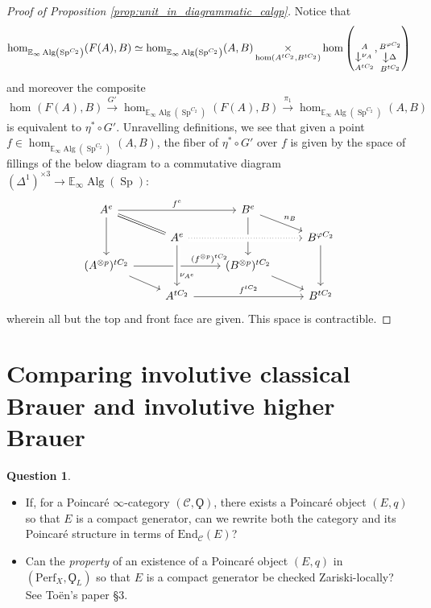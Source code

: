 \documentclass{article}
\DeclareMathOperator{\Alg}{Alg}
\DeclareMathOperator{\CAlgp}{CAlg^p} %
\DeclareMathOperator{\Spectra}{Sp} %
\DeclareMathOperator*{\fiberproduct}{\times}
\newcommand{\EE}{\mathbb{E}}
\newcommand{\morphism}[3]{\mathop{\rotatebox{270}{$\xrightarrow{\rotatebox{90}{$\scriptstyle#2$}}$}}\limits^{#1}_{#3}}
\theoremstyle{definition}
\newtheorem{question}[equation]{Question}
\begin{document}
\begin{proof}[Proof of Proposition \ref{prop:unit_in_diagrammatic_calgp}]
    Notice that 
    \begin{equation*}
        \hom_{\EE_\infty\Alg\left(\Spectra^{C_2}\right)}(F(A),B) \simeq \hom_{\EE_\infty\Alg\left(\Spectra^{C_2}\right)}(A,B) \fiberproduct_{\hom\left(A^{tC_2},B^{tC_2}\right) } \hom \left( \morphism{A}{\nu_A}{A^{tC_2}}, \morphism{B^{\varphi C_2}}{\Delta}{B^{tC_2}} \right)
    \end{equation*}
    and moreover the composite
    \begin{equation*}
        \hom_{\CAlgp}(F(A), B) \xrightarrow{G'} \hom_{\EE_\infty\Alg\left(\Spectra^{C_2}\right)}(F(A),B) \xrightarrow{\pi_1} \hom_{\EE_\infty\Alg\left(\Spectra^{C_2}\right)}(A,B)
    \end{equation*}
     is equivalent to $ \eta^* \circ G' $. 
    Unravelling definitions, we see that given a point $ f \in \hom_{\EE_\infty\Alg\left(\Spectra^{C_2}\right)}(A,B) $, the fiber of $ \eta^* \circ G' $ over $ f $ is given by the space of fillings of the below diagram to a commutative diagram $ (\Delta^1)^{\times 3} \to \EE_\infty\Alg(\Spectra) $:  
    \begin{equation*}
    \begin{tikzcd}[row sep=small] %
        A^e \ar[rr,"{f^e}"] \ar[dd] \ar[rd,equals] & & B^e \ar[dd] \ar[rd,"{n_B}"] & \\
            & A^e  \ar[rr, dotted,crossing over] & & B^{\varphi C_2} \ar[dd] \\
        {(A^{\otimes p})^{tC_2}} \ar[rr,"{(f^{\otimes p})^{tC_2}}",very near end] \ar[rd] & & {( B^{\otimes p})^{tC_2}} \ar[rd] & \\
        & A^{tC_2} \ar[rr,"{f^{tC_2}}"] & & B^{tC_2} \ar[from=2-2,to=4-2,crossing over,"{\nu_{A^e}}", near end]
    \end{tikzcd}
    \end{equation*} 
    wherein all but the top and front face are given. 
    This space is contractible. 
\end{proof}

\section{Comparing involutive classical Brauer and involutive higher Brauer}
\begin{question}
\begin{itemize}
    \item If, for a Poincaré $ \infty $-category $ (\mathcal{C},\Qoppa) $, there exists a Poincaré object $(E,q) $ so that $ E $ is a compact generator, can we rewrite both the category and its Poincaré structure in terms of $ \mathrm{End}_{\mathcal{C}}(E) $? 
    \item Can the \emph{property} of an existence of a Poincaré object $ (E,q) $ in $ \left(\mathrm{Perf}_X, \Qoppa_L \right) $ so that $ E $ is a compact generator be checked Zariski-locally? 
    See Toën's paper \S3.  
\end{itemize}
\end{question}
\end{document}
